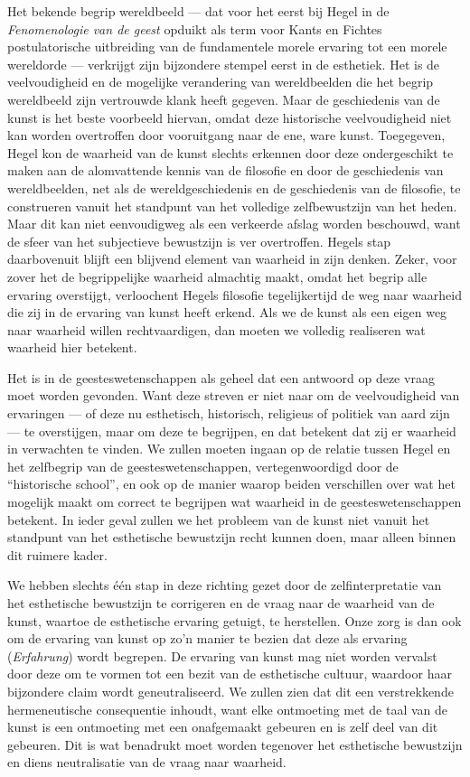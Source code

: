 Het bekende begrip wereldbeeld — dat voor het eerst bij Hegel in de \textit{Fenomenologie van de geest} opduikt als term voor Kants en Fichtes postulatorische uitbreiding van de fundamentele morele ervaring tot een morele wereldorde — verkrijgt zijn bijzondere stempel eerst in de esthetiek. Het is de veelvoudigheid en de mogelijke verandering van wereldbeelden die het begrip wereldbeeld zijn vertrouwde klank heeft gegeven. Maar de geschiedenis van de kunst is het beste voorbeeld hiervan, omdat deze historische veelvoudigheid niet kan worden overtroffen door vooruitgang naar de ene, ware kunst. Toegegeven, Hegel kon de waarheid van de kunst slechts erkennen door deze ondergeschikt te maken aan de alomvattende kennis van de filosofie en door de geschiedenis van wereldbeelden, net als de wereldgeschiedenis en de geschiedenis van de filosofie, te construeren vanuit het standpunt van het volledige zelfbewustzijn van het heden. Maar dit kan niet eenvoudigweg als een verkeerde afslag worden beschouwd, want de sfeer van het subjectieve bewustzijn is ver overtroffen. Hegels stap daarbovenuit blijft een blijvend element van waarheid in zijn denken. Zeker, voor zover het de begrippelijke waarheid almachtig maakt, omdat het begrip alle ervaring overstijgt, verloochent Hegels filosofie tegelijkertijd de weg naar waarheid die zij in de ervaring van kunst heeft erkend. Als we de kunst als een eigen weg naar waarheid willen rechtvaardigen, dan moeten we volledig realiseren wat waarheid hier betekent.

Het is in de geesteswetenschappen als geheel dat een antwoord op deze vraag moet worden gevonden. Want deze streven er niet naar om de veelvoudigheid van ervaringen — of deze nu esthetisch, historisch, religieus of politiek van aard zijn — te overstijgen, maar om deze te begrijpen, en dat betekent dat zij er waarheid in verwachten te vinden. We zullen moeten ingaan op de relatie tussen Hegel en het zelfbegrip van de geesteswetenschappen, vertegenwoordigd door de ``historische school'', en ook op de manier waarop beiden verschillen over wat het mogelijk maakt om correct te begrijpen wat waarheid in de geesteswetenschappen betekent. In ieder geval zullen we het probleem van de kunst niet vanuit het standpunt van het esthetische bewustzijn recht kunnen doen, maar alleen binnen dit ruimere kader.

We hebben slechts één stap in deze richting gezet door de zelfinterpretatie van het esthetische bewustzijn te corrigeren en de vraag naar de waarheid van de kunst, waartoe de esthetische ervaring getuigt, te herstellen. Onze zorg is dan ook om de ervaring van kunst op zo’n manier te bezien dat deze als ervaring (\textit{Erfahrung}) wordt begrepen. De ervaring van kunst mag niet worden vervalst door deze om te vormen tot een bezit van de esthetische cultuur, waardoor haar bijzondere claim wordt geneutraliseerd. We zullen zien dat dit een verstrekkende hermeneutische consequentie inhoudt, want elke ontmoeting met de taal van de kunst is een ontmoeting met een onafgemaakt gebeuren en is zelf deel van dit gebeuren. Dit is wat benadrukt moet worden tegenover het esthetische bewustzijn en diens neutralisatie van de vraag naar waarheid.

